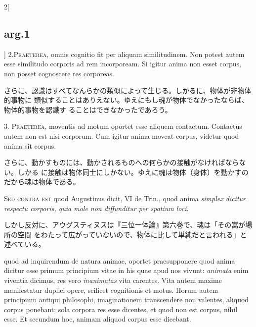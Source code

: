 \documentclass[paper=a4paper,fontsize=10pt,jafontsize=9pt,titlepage]{jlreq}
\begin{document}
\begin{paracol}{2}[\subsection{arg.1}]
2.{\scshape Praeterea}, omnis cognitio fit per aliquam
similitudinem. Non potest autem esse similitudo corporis ad rem
incorpoream. Si igitur anima non esset corpus, non posset cognoscere
res corporeas.



\switchcolumn

さらに、認識はすべてなんらかの類似によって生じる。しかるに、物体が非物体的事物に
類似することはありえない。ゆえにもし魂が物体でなかったならば、物体的事物を認識す
ることはできなかったであろう。



3. {\scshape Praeterea}, moventis ad motum oportet esse aliquem
contactum. Contactus autem non est nisi corporum. Cum igitur anima moveat
corpus, videtur quod anima sit corpus.


\switchcolumn

さらに、動かすものには、動かされるものへの何らかの接触がなければならない。しかる
に接触は物体同士にしかない。ゆえに魂は物体（身体）を動かすのだから魂は物体である。

\switchcolumn*[\subsection{s.c.}]


{\scshape Sed contra est} quod Augustinus dicit, VI de Trin., quod anima
 {\itshape simplex dicitur respectu corporis, quia mole non diffunditur per
 spatium loci}.


\switchcolumn

しかし反対に、アウグスティヌスは『三位一体論』第六巻で、魂は「その嵩が場所の空間
をわたって広がっていないので、物体に比して単純だと言われる」と述べている。

 quod ad inquirendum de natura animae, oportet
praesupponere quod anima dicitur esse primum principium vitae in his quae apud
nos vivunt: {\itshape animata} enim viventia dicimus, res vero {\itshape
inanimatas} vita carentes. Vita autem maxime manifestatur duplici opere,
scilicet cognitionis et motus. Horum autem principium antiqui philosophi,
imaginationem transcendere non valentes, aliquod corpus ponebant; sola corpora
res esse dicentes, et quod non est corpus, nihil esse. Et secundum hoc, animam
aliquod corpus esse dicebant.



\end{paracol}
\end{document}
